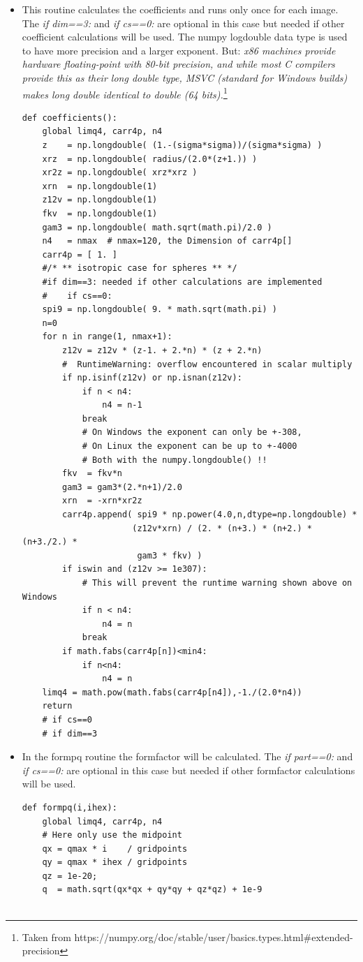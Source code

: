 \documentclass[11pt]{article} %
\begin{document}
\begin{itemize}
\item This routine calculates the coefficients and runs only once for each image. The {\it if dim==3:} and {\it if cs==0:} are optional in this case but needed if other coefficient calculations will be used. The numpy logdouble data type is used to have more precision and a larger exponent. But: {\it x86 machines provide hardware floating-point with 80-bit precision, and while most C compilers provide this as their long double type, MSVC (standard for Windows builds) makes long double identical to double (64 bits).}\footnote{Taken from https://numpy.org/doc/stable/user/basics.types.html\#extended-precision}
\begin{lstlisting}[frame=single]
def coefficients():
    global limq4, carr4p, n4
    z    = np.longdouble( (1.-(sigma*sigma))/(sigma*sigma) )
    xrz  = np.longdouble( radius/(2.0*(z+1.)) )
    xr2z = np.longdouble( xrz*xrz )
    xrn  = np.longdouble(1)
    z12v = np.longdouble(1)
    fkv  = np.longdouble(1)
    gam3 = np.longdouble( math.sqrt(math.pi)/2.0 )
    n4   = nmax  # nmax=120, the Dimension of carr4p[]
    carr4p = [ 1. ]
    #/* ** isotropic case for spheres ** */
    #if dim==3: needed if other calculations are implemented
    #    if cs==0:
    spi9 = np.longdouble( 9. * math.sqrt(math.pi) )
    n=0
    for n in range(1, nmax+1):
        z12v = z12v * (z-1. + 2.*n) * (z + 2.*n)
        #  RuntimeWarning: overflow encountered in scalar multiply
        if np.isinf(z12v) or np.isnan(z12v):
            if n < n4:
                n4 = n-1
            break
            # On Windows the exponent can only be +-308,
            # On Linux the exponent can be up to +-4000
            # Both with the numpy.longdouble() !!
        fkv  = fkv*n
        gam3 = gam3*(2.*n+1)/2.0
        xrn  = -xrn*xr2z
        carr4p.append( spi9 * np.power(4.0,n,dtype=np.longdouble) *
                      (z12v*xrn) / (2. * (n+3.) * (n+2.) * (n+3./2.) *
                       gam3 * fkv) )
        if iswin and (z12v >= 1e307):
            # This will prevent the runtime warning shown above on Windows
            if n < n4:
                n4 = n
            break
        if math.fabs(carr4p[n])<min4:
            if n<n4:
                n4 = n
    limq4 = math.pow(math.fabs(carr4p[n4]),-1./(2.0*n4))
    return
    # if cs==0
    # if dim==3
\end{lstlisting}

\item In the formpq routine the formfactor will be calculated. The {\it if part==0:} and {\it if cs==0:} are optional in this case but needed if other formfactor calculations will be used.
\begin{lstlisting}[frame=single]
def formpq(i,ihex):
    global limq4, carr4p, n4
    # Here only use the midpoint
    qx = qmax * i    / gridpoints
    qy = qmax * ihex / gridpoints
    qz = 1e-20;
    q  = math.sqrt(qx*qx + qy*qy + qz*qz) + 1e-9


\end{lstlisting}
\end{itemize}
\end{document}
